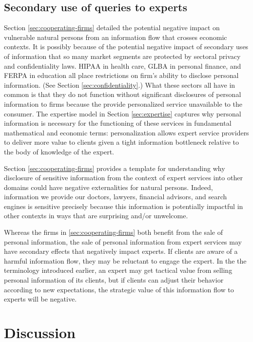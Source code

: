 \documentclass[../thesis.tex]{subfiles}
\begin{document}
\subsection{Secondary use of queries to experts}

Section \ref{sec:cooperating-firms} detailed the
potential negative impact on vulnerable natural persons from
an information flow that crosses economic contexts.
It is possibly because of the potential negative impact
of secondary uses of information that so many market segments
are protected by sectoral privacy and confidentiality laws.
HIPAA in health care,
GLBA in personal finance, and FERPA in education all
place restrictions on firm's ability to disclose personal
information. (See Section \ref{sec:confidentiality}.)
What these sectors all have in common is that they do not
function without significant disclosures of personal
information to firms because the provide personalized
service unavailable to the consumer.
The expertise model in Section \ref{sec:expertise}
captures why personal information is necessary for
the functioning of these services in fundamental
mathematical and economic terms: personalization
allows expert service providers to deliver more
value to clients given a tight information bottleneck
relative to the body of knowledge of the expert.

Section \ref{sec:cooperating-firms} provides a template
for understanding why disclosure of sensitive information
from the context of expert services into other domains
could have negative externalities for natural persons.
Indeed, information we provide our doctors, lawyers,
financial advisors, and search engines is sensitive
precisely because this information is potentially
impactful in other contexts in ways that are surprising
and/or unwelcome.

Whereas the firms in \ref{sec:cooperating-firms} both benefit
from the sale of personal information, the sale of personal
information from expert services may have secondary effects
that negatively impact experts.
If clients are aware of a harmful information flow, they
may be reluctant to engage the expert.
In the the terminology introduced earlier, an expert
may get tactical value from selling personal information
of its clients, but if clients can adjust their behavior
according to new expectations, the strategic value of
this information flow to experts will be negative.

\section{Discussion}
\label{sec:discussion}
\end{document}
